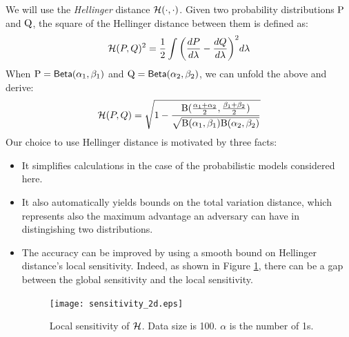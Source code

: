 \documentclass{article}
\begin{document}
We will use the \emph{Hellinger} distance $\mathcal{H}(\cdot,\cdot)$.
Given two probability distributions $\textup{P}$ and $\textup{Q}$,
the square of the Hellinger distance between them is defined as:
\[
\mathcal{H}(P,Q)^2 =\frac{1}{2} \int \bigg(\frac{dP}{d \lambda} - \frac{dQ}{d \lambda}\bigg)^2 d \lambda
\]
When $\textup{P}=\mathsf{Beta}(\alpha_1, \beta_1)$ and $\textup{Q}=\mathsf{Beta}(\alpha_2, \beta_2)$, we can unfold the above and derive: 
\[
 \mathcal{H}(P,Q) =  \sqrt{1 - \frac{\textup{B}(\frac{\alpha_1 + \alpha_2}{2}, \frac{\beta_1 + \beta_2}{2})}{\sqrt{\textup{B}(\alpha_1,\beta_1)\textup{B}(\alpha_2,\beta_2)}}}
\]
Our choice to use Hellinger distance is motivated by three facts:
\begin{itemize}
  \item It simplifies calculations in the case of the probabilistic models considered here.
  
  \item It also automatically yields bounds on the total variation distance, which represents also the maximum advantage an adversary can have in distingishing two distributions. 

  \item The accuracy can be improved by using a smooth bound on Hellinger distance's local sensitivity. Indeed, as shown in Figure \ref{fig_sensitivity}, there can be a gap
    between the global sensitivity and the local sensitivity.
\begin{figure}[ht]
\centering
\texttt{[image: sensitivity\_2d.eps]}
\caption{Local sensitivity of $\mathcal{H}$. Data size is 100. $\alpha$ is the number of 1s.}
\label{fig_sensitivity}
\end{figure}
\end{itemize}
\end{document}
